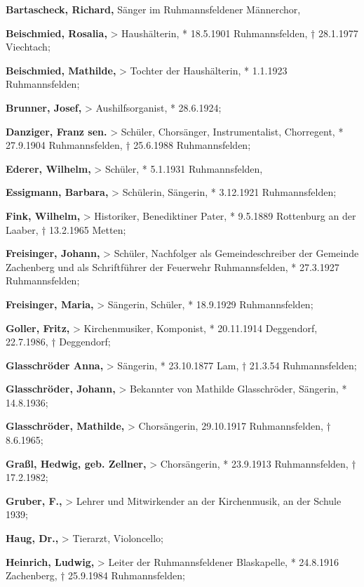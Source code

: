 \documentclass[a4paper]{article}
\begin{document}
\textbf{Bartascheck, Richard, }Sänger im Ruhmannsfeldener Männerchor,

\textbf{Beischmied, Rosalia,} {\textgreater} Haushälterin, * 18.5.1901
Ruhmannsfelden, † 28.1.1977 Viechtach;

\textbf{Beischmied, Mathilde,} {\textgreater} Tochter der Haushälterin,
* 1.1.1923 Ruhmannsfelden;

\textbf{Brunner, Josef, }{\textgreater} Aushilfsorganist, * 28.6.1924;

\textbf{Danziger, Franz sen.} {\textgreater} Schüler, Chorsänger,
Instrumentalist, Chorregent, * 27.9.1904 Ruhmannsfelden, † 25.6.1988
Ruhmannsfelden;

\textbf{Ederer, Wilhelm,} {\textgreater} Schüler, * 5.1.1931
Ruhmannsfelden,

\textbf{Essigmann, Barbara,} {\textgreater} Schülerin, Sängerin, *
3.12.1921 Ruhmannsfelden;

\textbf{Fink, Wilhelm,} {\textgreater} Historiker, Benediktiner Pater, *
9.5.1889 Rottenburg an der Laaber, † 13.2.1965 Metten;

\textbf{Freisinger, Johann,} {\textgreater} Schüler, Nachfolger als
Gemeindeschreiber der Gemeinde Zachenberg und als Schriftführer der
Feuerwehr Ruhmannsfelden, * 27.3.1927 Ruhmannsfelden;

\textbf{Freisinger, Maria,} {\textgreater} Sängerin, Schüler, *
18.9.1929 Ruhmannsfelden;

\textbf{Goller, Fritz, }{\textgreater} Kirchenmusiker, Komponist, *
20.11.1914 Deggendorf, 22.7.1986, † Deggendorf;

\textbf{Glasschröder Anna,} {\textgreater} Sängerin, * 23.10.1877 Lam, †
21.3.54 Ruhmannsfelden;

\textbf{Glasschröder, Johann,} {\textgreater} Bekannter von Mathilde
Glasschröder, Sängerin, * 14.8.1936;

\textbf{Glasschröder, Mathilde,} {\textgreater} Chorsängerin, 29.10.1917
Ruhmannsfelden, † 8.6.1965;

\textbf{Graßl, Hedwig, geb. Zellner,} {\textgreater} Chorsängerin, *
23.9.1913 Ruhmannsfelden, † 17.2.1982;

\textbf{Gruber, F.,} {\textgreater} Lehrer und Mitwirkender an der
Kirchenmusik, an der Schule 1939;

\textbf{Haug, Dr.,} {\textgreater} Tierarzt, Violoncello;

\textbf{Heinrich, Ludwig,} {\textgreater} Leiter der Ruhmannsfeldener
Blaskapelle, * 24.8.1916 Zachenberg, † 25.9.1984 Ruhmannsfelden;
\end{document}
